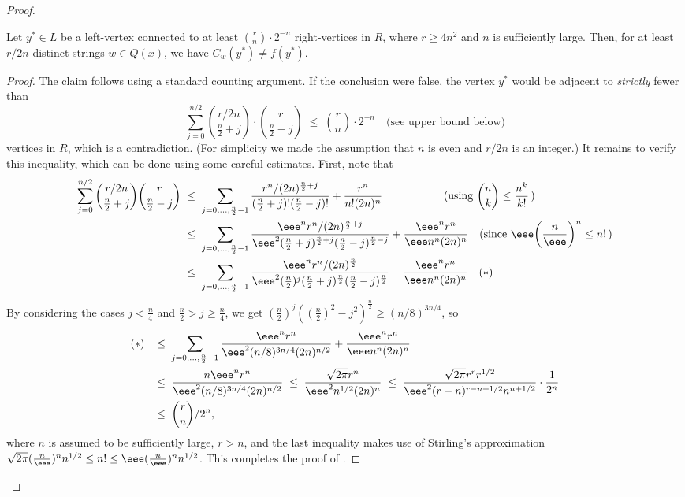 \documentclass{toc}
\begin{document}
\begin{proof}
\begin{claim}\label{c:y_is_good}
Let $y^* \in L$ be a left-vertex connected to at least $\binom{r}{n} \cdot 2^{-n}$ right-vertices in $R$, where $r \geq 4n^2$ and $n$ is sufficiently large. Then, for at least $r/2n$ distinct strings $w \in Q(x)$, we have $C_w(y^*) \neq f(y^*)$.  
\end{claim}

\begin{proof}
  The claim follows using a standard counting argument. If the conclusion were false, the vertex $y^*$ would be
%
adjacent   %
to \emph{strictly}
%
fewer  %
than
%
%
%
$$
\sum_{j = 0}^{n/2} \binom{r/2n}{\frac{n}{2} + j} \cdot \binom{r}{\frac{n}{2} - j} \; \leq \; \binom{r}{n} \cdot 2^{-n} \quad
%
\text{(see upper bound below)} %
$$
vertices in $R$, which is %
a contradiction.  %
(For simplicity we made the assumption that $n$ is even and $r/2n$ is an integer.)  %
It remains to verify this inequality, which can be done using some careful estimates. First, note that
\begin{equation*} 
\begin{split}
\sum_{j=0}^{n/2}\binom{r/2n}{\frac{n}{2}+j}\binom{r}{\frac{n}{2}-j} & \;\le\; \sum_{j=0,\dots,\frac{n}{2}-1}\frac{r^n/(2n)^{\frac{n}{2}+j}}{(\frac{n}{2}+j)!(\frac{n}{2}-j)!}+\frac{r^n}{n!(2n)^n}\quad\quad\quad\quad\quad \;\;(\text{using }\binom{n}{k}\le \frac{n^k}{k!}\,)\\
& \;\le\; \sum_{j=0,\dots,\frac{n}{2}-1}\frac{\eee^nr^n/(2n)^{\frac{n}{2}+j}}{\eee^2(\frac{n}{2}+j)^{\frac{n}{2}+j}(\frac{n}{2}-j)^{\frac{n}{2}-j}}+\frac{\eee^nr^n}{\eee n^n(2n)^n} \quad (\text{since }\eee\!\left (\frac{n}{\eee} \right)^n\le n!\,) \\
& \;\le\; \sum_{j=0,\dots,\frac{n}{2}-1}\frac{\eee^nr^n/(2n)^{\frac{n}{2}}}{\eee^2(\frac{n}{2})^j(\frac{n}{2}+j)^{\frac{n}{2}}(\frac{n}{2}-j)^{\frac{n}{2}}}+\frac{\eee^nr^n}{\eee n^n(2n)^n} \quad (*)
\end{split}
\end{equation*}
By considering the cases $j<\frac{n}{4}$ and $\frac{n}{2}>j\ge \frac{n}{4}$, we get $(\frac{n}{2})^j((\frac{n}{2})^2-j^2)^{\frac{n}{2}}\ge (n/8)^{3n/4}$, so
\begin{equation*}
\begin{split}
(*) & \;\;\;\le\; \sum_{j=0,\dots,\frac{n}{2}-1}\frac{\eee^nr^n}{\eee^2(n/8)^{3n/4}(2n)^{n/2}}+\frac{\eee^nr^n}{\eee n^n(2n)^n}\\
& \;\;\;\le\; \frac{n\eee^nr^n}{\eee^2(n/8)^{3n/4}(2n)^{n/2}} \;\le\; \frac{\sqrt{2\pi}r^n}{\eee^2n^{1/2}(2n)^n} \;\le\; \frac{\sqrt{2\pi}r^rr^{1/2}}{\eee^2(r-n)^{r-n+1/2}n^{n+1/2}} \cdot \frac{1}{2^{n}}\\
& \;\;\;\le\; \binom{r}{n}/2^n,
\end{split}
\end{equation*}
where $n$ is assumed to be sufficiently large, $r > n$,  and the last inequality makes use of Stirling's approximation $\sqrt{2\pi}(\frac{n}{\eee})^nn^{1/2}\le n!\le \eee(\frac{n}{\eee})^nn^{1/2}$. This completes the proof of .
\end{proof}


\end{proof}
\end{document}
